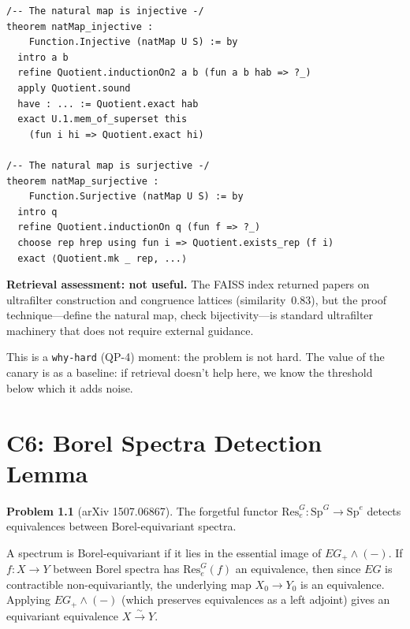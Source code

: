 \documentclass[12pt,oneside]{book}
\theoremstyle{plain}
\theoremstyle{definition}
\newtheorem{problem}{Problem}[chapter]
\theoremstyle{remark}
\begin{document}
\begin{leanbox}
\begin{Verbatim}[fontsize=\small]
/-- The natural map is injective -/
theorem natMap_injective :
    Function.Injective (natMap U S) := by
  intro a b
  refine Quotient.inductionOn2 a b (fun a b hab => ?_)
  apply Quotient.sound
  have : ... := Quotient.exact hab
  exact U.1.mem_of_superset this
    (fun i hi => Quotient.exact hi)

/-- The natural map is surjective -/
theorem natMap_surjective :
    Function.Surjective (natMap U S) := by
  intro q
  refine Quotient.inductionOn q (fun f => ?_)
  choose rep hrep using fun i => Quotient.exists_rep (f i)
  exact ⟨Quotient.mk _ rep, ...⟩
\end{Verbatim}
\end{leanbox}

\begin{notebox}
\textbf{Retrieval assessment: not useful.} The FAISS index returned
papers on ultrafilter construction and congruence lattices
(similarity~0.83), but the proof technique---define the natural map,
check bijectivity---is standard ultrafilter machinery that does not
require external guidance.

This is a \texttt{why-hard} (QP-4) moment: the problem is not hard.
The value of the canary is as a baseline: if retrieval doesn't help
here, we know the threshold below which it adds noise.
\end{notebox}

\chapter{C6: Borel Spectra Detection Lemma}\label{ch:c6}

\begin{problem}[arXiv 1507.06867]
The forgetful functor $\mathrm{Res}_e^G : \mathrm{Sp}^G \to \mathrm{Sp}^e$
detects equivalences between Borel-equivariant spectra.
\end{problem}

\begin{proofbox}
A spectrum is Borel-equivariant if it lies in the essential image of
$EG_+ \wedge (-)$. If $f : X \to Y$ between Borel spectra has
$\mathrm{Res}_e^G(f)$ an equivalence, then since $EG$ is contractible
non-equivariantly, the underlying map $X_0 \to Y_0$ is an equivalence.
Applying $EG_+ \wedge (-)$ (which preserves equivalences as a left
adjoint) gives an equivariant equivalence $X \xrightarrow{\sim} Y$.
\end{proofbox}
\end{document}
